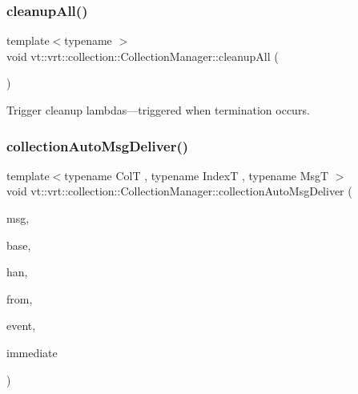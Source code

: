 \subsubsection{\texorpdfstring{cleanup\+All()}{cleanupAll()}}
{\footnotesize\ttfamily template$<$typename $>$ \\
void vt\+::vrt\+::collection\+::\+Collection\+Manager\+::cleanup\+All (\begin{DoxyParamCaption}{ }\end{DoxyParamCaption})}



Trigger cleanup lambdas---triggered when termination occurs. 

\mbox{\label{structvt_1_1vrt_1_1collection_1_1_collection_manager_ab0cf53c9b1b825ff71a475379f083317}} 
\subsubsection{\texorpdfstring{collection\+Auto\+Msg\+Deliver()}{collectionAutoMsgDeliver()}\hspace{0.1cm}{\footnotesize\ttfamily [1/2]}}
{\footnotesize\ttfamily template$<$typename ColT , typename IndexT , typename MsgT $>$ \\
void vt\+::vrt\+::collection\+::\+Collection\+Manager\+::collection\+Auto\+Msg\+Deliver (\begin{DoxyParamCaption}\item[{MsgT $\ast$}]{msg,  }\item[{\hyperlink{structvt_1_1vrt_1_1collection_1_1_indexable}{Indexable}$<$ IndexT $>$ $\ast$}]{base,  }\item[{\hyperlink{namespacevt_af64846b57dfcaf104da3ef6967917573}{Handler\+Type}}]{han,  }\item[{\hyperlink{namespacevt_a866da9d0efc19c0a1ce79e9e492f47e2}{Node\+Type}}]{from,  }\item[{\mbox{[}\mbox{[}maybe\+\_\+unused\mbox{]} \mbox{]} \hyperlink{namespacevt_1_1trace_a64a7185f3e102df8d8258f263ccd1582}{trace\+::\+Trace\+Event\+I\+D\+Type}}]{event,  }\item[{bool}]{immediate }\end{DoxyParamCaption})}

